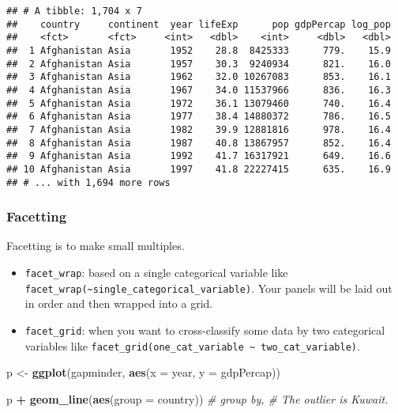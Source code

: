 \documentclass[
]{book}
\newenvironment{Shaded}{\begin{snugshade}}{\end{snugshade}}
\newcommand{\CommentTok}[1]{\textcolor[rgb]{0.56,0.35,0.01}{\textit{#1}}}
\newcommand{\DataTypeTok}[1]{\textcolor[rgb]{0.13,0.29,0.53}{#1}}
\newcommand{\KeywordTok}[1]{\textcolor[rgb]{0.13,0.29,0.53}{\textbf{#1}}}
\newcommand{\NormalTok}[1]{#1}
\newcommand{\OperatorTok}[1]{\textcolor[rgb]{0.81,0.36,0.00}{\textbf{#1}}}
\newcommand{\StringTok}[1]{\textcolor[rgb]{0.31,0.60,0.02}{#1}}
\begin{document}
\begin{verbatim}
## # A tibble: 1,704 x 7
##    country     continent  year lifeExp      pop gdpPercap log_pop
##    <fct>       <fct>     <int>   <dbl>    <int>     <dbl>   <dbl>
##  1 Afghanistan Asia       1952    28.8  8425333      779.    15.9
##  2 Afghanistan Asia       1957    30.3  9240934      821.    16.0
##  3 Afghanistan Asia       1962    32.0 10267083      853.    16.1
##  4 Afghanistan Asia       1967    34.0 11537966      836.    16.3
##  5 Afghanistan Asia       1972    36.1 13079460      740.    16.4
##  6 Afghanistan Asia       1977    38.4 14880372      786.    16.5
##  7 Afghanistan Asia       1982    39.9 12881816      978.    16.4
##  8 Afghanistan Asia       1987    40.8 13867957      852.    16.4
##  9 Afghanistan Asia       1992    41.7 16317921      649.    16.6
## 10 Afghanistan Asia       1997    41.8 22227415      635.    16.9
## # ... with 1,694 more rows
\end{verbatim}

\hypertarget{facetting}{%
\subsubsection{Facetting}\label{facetting}}

Facetting is to make small multiples.

\begin{itemize}
\item
  \texttt{facet\_wrap}: based on a single categorical variable like \texttt{facet\_wrap(\textasciitilde{}single\_categorical\_variable)}. Your panels will be laid out in order and then wrapped into a grid.
\item
  \texttt{facet\_grid}: when you want to cross-classify some data by two categorical variables like \texttt{facet\_grid(one\_cat\_variable\ \textasciitilde{}\ two\_cat\_variable)}.
\end{itemize}

\begin{Shaded}
\begin{Highlighting}[]
\NormalTok{p \textless{}{-}}\StringTok{ }\KeywordTok{ggplot}\NormalTok{(gapminder, }\KeywordTok{aes}\NormalTok{(}\DataTypeTok{x =}\NormalTok{ year, }\DataTypeTok{y =}\NormalTok{ gdpPercap))}

\NormalTok{p }\OperatorTok{+}\StringTok{ }\KeywordTok{geom\_line}\NormalTok{(}\KeywordTok{aes}\NormalTok{(}\DataTypeTok{group =}\NormalTok{ country)) }\CommentTok{\# group by, \# The outlier is Kuwait.}
\end{Highlighting}
\end{Shaded}
\end{document}
